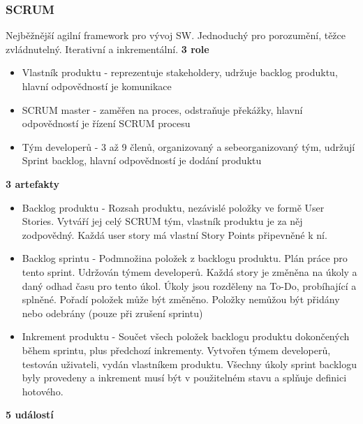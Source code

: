 \documentclass[11pt,a4paper]{article}
\begin{document}
    \subsubsection{SCRUM}
        Nejběžnější agilní framework pro vývoj SW. Jednoduchý pro porozumění, těžce zvládnutelný. Iterativní a inkrementální.
        \textbf{3 role}
        \begin{itemize}
            \item Vlastník produktu - reprezentuje stakeholdery, udržuje backlog produktu, hlavní odpovědností je komunikace
            \item SCRUM master - zaměřen na proces, odstraňuje překážky, hlavní odpovědností je řízení SCRUM procesu
            \item Tým developerů - 3 až 9 členů, organizovaný a sebeorganizovaný tým, udržují Sprint backlog, hlavní odpovědností je dodání produktu
        \end{itemize}
        \textbf{3 artefakty}
        \begin{itemize}
            \item Backlog produktu - Rozsah produktu, nezávislé položky ve formě User Stories. Vytváří jej celý SCRUM tým, vlastník produktu je za něj zodpovědný. Každá user story má vlastní Story Points připevněné k ní.
            \item Backlog sprintu - Podmnožina položek z backlogu produktu. Plán práce pro tento sprint. Udržován týmem developerů. Každá story je změněna na úkoly a daný odhad času pro tento úkol. Úkoly jsou rozděleny na To-Do, probíhající a splněné. Pořadí položek může být změněno. Položky nemůžou být přidány nebo odebrány (pouze při zrušení sprintu)
            \item Inkrement produktu - Součet všech položek backlogu produktu dokončených během sprintu, plus předchozí inkrementy. Vytvořen týmem developerů, testován uživateli, vydán vlastníkem produktu. Všechny úkoly sprint backlogu byly provedeny a inkrement musí být v použitelném stavu a splňuje definici hotového.
        \end{itemize}
        \textbf{5 událostí}
\end{document}
